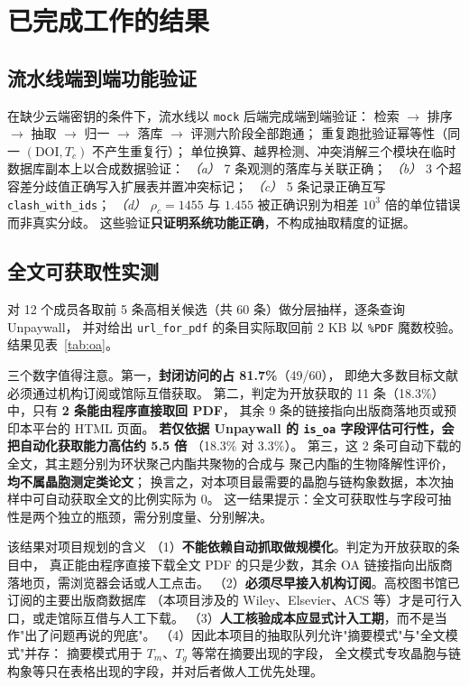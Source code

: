 \documentclass[11pt,a4paper]{ctexart}
\begin{document}
\section{已完成工作的结果}\label{sec:results}

\subsection{流水线端到端功能验证}

在缺少云端密钥的条件下，流水线以 \texttt{mock} 后端完成端到端验证：
检索 $\to$ 排序 $\to$ 抽取 $\to$ 归一 $\to$ 落库 $\to$ 评测六阶段全部跑通；
重复跑批验证幂等性（同一 $(\text{DOI}, T_c)$ 不产生重复行）；
单位换算、越界检测、冲突消解三个模块在临时数据库副本上以合成数据验证：
\textit{（a）} 7 条观测的落库与关联正确；
\textit{（b）} 3 个超容差分歧值正确写入扩展表并置冲突标记；
\textit{（c）} 5 条记录正确互写 \texttt{clash\_with\_ids}；
\textit{（d）} $\rho_c = 1455$ 与 $1.455$ 被正确识别为相差 $10^3$ 倍的单位错误而非真实分歧。
这些验证\textbf{只证明系统功能正确}，不构成抽取精度的证据。

\subsection{全文可获取性实测}\label{sec:oa-result}

对 12 个成员各取前 5 条高相关候选（共 60 条）做分层抽样，逐条查询 Unpaywall，
并对给出 \texttt{url\_for\_pdf} 的条目实际取回前 2 KB 以 \texttt{\%PDF} 魔数校验。
结果见表~\ref{tab:oa}。

三个数字值得注意。第一，\textbf{封闭访问的占 81.7\%}（49/60），
即绝大多数目标文献必须通过机构订阅或馆际互借获取。
第二，判定为开放获取的 11 条（18.3\%）中，只有 \textbf{2 条能由程序直接取回 PDF}，
其余 9 条的链接指向出版商落地页或预印本平台的 HTML 页面。
\textbf{若仅依据 Unpaywall 的 \texttt{is\_oa} 字段评估可行性，会把自动化获取能力高估约 5.5 倍}
（18.3\% 对 3.3\%）。
第三，这 2 条可自动下载的全文，其主题分别为环状聚己内酯共聚物的合成与
聚己内酯的生物降解性评价，\textbf{均不属晶胞测定类论文}；
换言之，对本项目最需要的晶胞与链构象数据，本次抽样中可自动获取全文的比例实际为 0。
这一结果提示：全文可获取性与字段可抽性是两个独立的瓶颈，需分别度量、分别解决。



\begin{tipbox}{该结果对项目规划的含义}
（1）\textbf{不能依赖自动抓取做规模化}。判定为开放获取的条目中，
真正能由程序直接下载全文 PDF 的只是少数，其余 OA 链接指向出版商落地页，需浏览器会话或人工点击。
（2）\textbf{必须尽早接入机构订阅}。高校图书馆已订阅的主要出版商数据库
（本项目涉及的 Wiley、Elsevier、ACS 等）才是可行入口，或走馆际互借与人工下载。
（3）\textbf{人工核验成本应显式计入工期}，而不是当作"出了问题再说的兜底"。
（4）因此本项目的抽取队列允许"摘要模式"与"全文模式"并存：
摘要模式用于 $T_m$、$T_g$ 等常在摘要出现的字段，
全文模式专攻晶胞与链构象等只在表格出现的字段，并对后者做人工优先处理。
\end{tipbox}
\end{document}
